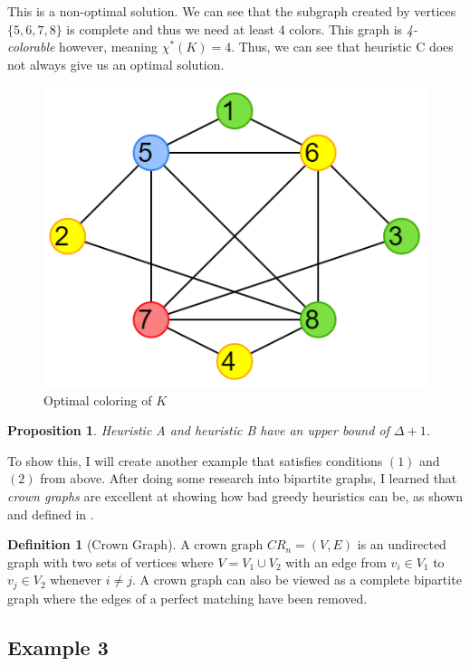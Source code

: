 \documentclass{article}
\newtheorem{prop}{Proposition}
\theoremstyle{definition}
\newtheorem*{definition}{Definition}
\begin{document}
This is a non-optimal solution. We can see that the subgraph created by vertices \(\{5, 6, 7, 8\}\) is complete and thus we need at least 4 colors. This graph is \emph{4-colorable} however, meaning \(\chi^{*}(K) = 4\). Thus, we can see that heuristic C does not always give us an optimal solution.

\begin{figure}[H]
\centering
\includegraphics[scale=0.38]{images/mis-3.png}
\caption{Optimal coloring of \(K\)}
\end{figure}

\begin{prop}
Heuristic A and heuristic B have an upper bound of \(\Delta + 1\).
\end{prop}

To show this, I will create another example that satisfies conditions \((1)\) and \((2)\) from above. After doing some research into bipartite graphs, I learned that \emph{crown graphs} are excellent at showing how bad greedy heuristics can be, as shown and defined in \cite{kordecki}.

\begin{definition}[Crown Graph]
A crown graph \(CR_n = (V, E)\) is an undirected graph with two sets of vertices where \(V = V_1 \cup V_2\) with an edge from \(v_i \in V_1\) to \(v_{j} \in V_2\) whenever \(i \neq j\). A crown graph can also be viewed as a complete bipartite graph where the edges of a perfect matching have been removed.
\end{definition}

\subsection*{Example 3}
\end{document}
